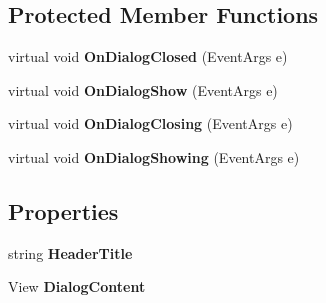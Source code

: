 \subsection*{Protected Member Functions}
\begin{DoxyCompactItemize}
\item 
\mbox{\label{class_tutor_scout24_1_1_controls_1_1_pop_up_dialog_view_ad94f29a468f808bd3df2f16bd316a690}} 
virtual void {\bfseries On\+Dialog\+Closed} (Event\+Args e)
\item 
\mbox{\label{class_tutor_scout24_1_1_controls_1_1_pop_up_dialog_view_a9ae15e562c965056f4aad6c4dcf4d30a}} 
virtual void {\bfseries On\+Dialog\+Show} (Event\+Args e)
\item 
\mbox{\label{class_tutor_scout24_1_1_controls_1_1_pop_up_dialog_view_afed7d0e00e8fdb5f24dca196e7e394a0}} 
virtual void {\bfseries On\+Dialog\+Closing} (Event\+Args e)
\item 
\mbox{\label{class_tutor_scout24_1_1_controls_1_1_pop_up_dialog_view_afb2a00f6c9c0eb1e38ce23afb630cc32}} 
virtual void {\bfseries On\+Dialog\+Showing} (Event\+Args e)
\end{DoxyCompactItemize}
\subsection*{Properties}
\begin{DoxyCompactItemize}
\item 
\mbox{\label{class_tutor_scout24_1_1_controls_1_1_pop_up_dialog_view_a6c86c519c0008630cc206b9a5e82fc07}} 
string {\bfseries Header\+Title}
\item 
\mbox{\label{class_tutor_scout24_1_1_controls_1_1_pop_up_dialog_view_abaa98c7f404c5cccac1e294648cbbdad}} 
View {\bfseries Dialog\+Content}
\end{DoxyCompactItemize}

